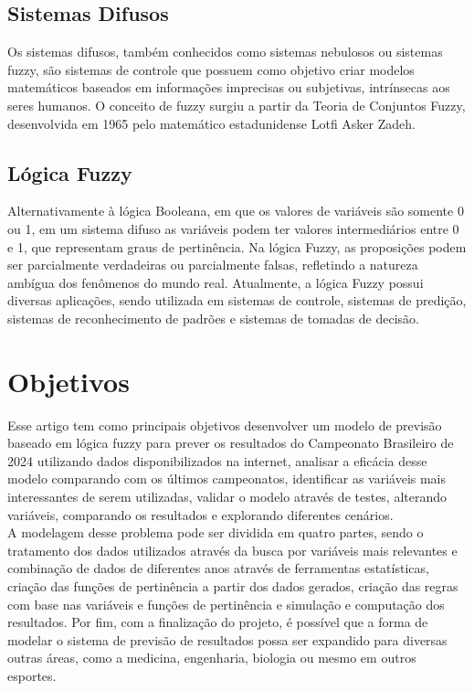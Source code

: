 \documentclass[conference]{IEEEtran}
\begin{document}
\subsection{Sistemas Difusos}
\indent Os sistemas difusos, também conhecidos como sistemas nebulosos ou 
sistemas fuzzy, são sistemas de controle que possuem como objetivo criar modelos 
matemáticos baseados em informações imprecisas ou subjetivas, intrínsecas aos 
seres humanos. O conceito de fuzzy surgiu a partir da Teoria de Conjuntos Fuzzy, 
desenvolvida em 1965 pelo matemático estadunidense Lotfi Asker Zadeh.

\subsection{Lógica Fuzzy}
\indent Alternativamente à lógica Booleana, em que os valores de variáveis são 
somente 0 ou 1, em um sistema difuso as variáveis podem ter valores 
intermediários entre 0 e 1, que representam graus de pertinência. Na lógica 
Fuzzy, as proposições podem ser parcialmente verdadeiras ou parcialmente falsas, 
refletindo a natureza ambígua dos fenômenos do mundo real. Atualmente, a lógica 
Fuzzy possui diversas aplicações, sendo utilizada em sistemas de controle, 
sistemas de predição, sistemas de reconhecimento de padrões e sistemas de 
tomadas de decisão.

\section{Objetivos}
\indent Esse artigo tem como principais objetivos desenvolver um modelo de 
previsão baseado em lógica fuzzy para prever os resultados do Campeonato 
Brasileiro de 2024 utilizando dados disponibilizados na internet, analisar a 
eficácia desse modelo comparando com os últimos campeonatos, identificar as 
variáveis mais interessantes de serem utilizadas, validar o modelo através de 
testes, alterando variáveis, comparando os resultados e explorando diferentes 
cenários.\\
\indent A modelagem desse problema pode ser dividida em quatro partes, sendo o 
tratamento dos dados utilizados através da busca por variáveis mais 
relevantes e combinação de dados de diferentes anos através de ferramentas 
estatísticas, criação das funções de pertinência a partir dos dados gerados, 
criação das regras com base nas variáveis e funções de pertinência e simulação 
e computação dos resultados.
\indent Por fim, com a finalização do projeto, é possível que a forma de modelar 
o sistema de previsão de resultados possa ser expandido para diversas outras 
áreas, como a medicina, engenharia, biologia ou mesmo em outros esportes.
\end{document}
